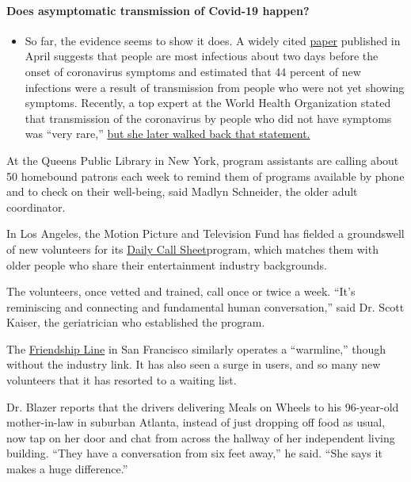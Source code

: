 \begin{itemize}
{  \paragraph{Does asymptomatic transmission of Covid-19
  happen?}\label{does-asymptomatic-transmission-of-covid-19-happen}}

  \begin{itemize}
  \tightlist
  \item
    So far, the evidence seems to show it does. A widely cited
    \href{https://www.nature.com/articles/s41591-020-0869-5}{paper}
    published in April suggests that people are most infectious about
    two days before the onset of coronavirus symptoms and estimated that
    44 percent of new infections were a result of transmission from
    people who were not yet showing symptoms. Recently, a top expert at
    the World Health Organization stated that transmission of the
    coronavirus by people who did not have symptoms was ``very rare,''
    \href{https://www.nytimes3xbfgragh.onion/2020/06/09/world/coronavirus-updates.html?action=click\&pgtype=Article\&state=default\&region=MAIN_CONTENT_3\&context=storylines_faq\#link-1f302e21}{but
    she later walked back that statement.}
  \end{itemize}
\end{itemize}

At the Queens Public Library in New York, program assistants are calling
about 50 homebound patrons each week to remind them of programs
available by phone and to check on their well-being, said Madlyn
Schneider, the older adult coordinator.

In Los Angeles, the Motion Picture and Television Fund has fielded a
groundswell of new volunteers for its
\href{https://mptf.com/daily-call-sheet}{Daily Call Sheet}program, which
matches them with older people who share their entertainment industry
backgrounds.

The volunteers, once vetted and trained, call once or twice a week.
``It's reminiscing and connecting and fundamental human conversation,''
said Dr. Scott Kaiser, the geriatrician who established the program.

The
\href{https://www.ioaging.org/services/all-inclusive-health-care/friendship-line}{Friendship
Line} in San Francisco similarly operates a ``warmline,'' though without
the industry link. It has also seen a surge in users, and so many new
volunteers that it has resorted to a waiting list.

Dr. Blazer reports that the drivers delivering Meals on Wheels to his
96-year-old mother-in-law in suburban Atlanta, instead of just dropping
off food as usual, now tap on her door and chat from across the hallway
of her independent living building. ``They have a conversation from six
feet away,'' he said. ``She says it makes a huge difference.''

